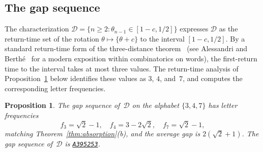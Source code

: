\documentclass{birkjour}
\newtheorem{proposition}[theorem]{Proposition}
\theoremstyle{definition}
\theoremstyle{remark}
\newcommand{\frc}[1]{\{ #1 \}}
\begin{document}
\subsection{The gap sequence}

The characterization
$\mathcal{D}=\{n\ge 2:\theta_{n-1}\in[1-c,1/2]\}$
expresses $\mathcal{D}$ as the return-time set of
the rotation $\theta\mapsto\frc{\theta+c}$ to the
interval $[1-c,1/2]$. By a standard return-time form of the
three-distance theorem~\cite{Sos} (see Alessandri and
Berth\'e~\cite{AlessandriBerthe} for a modern
exposition within combinatorics on words),
the first-return time to the interval takes at most three
values. The
return-time analysis of
Proposition~\ref{prop:defect_substitution} below
identifies these values as $3$, $4$, and~$7$, and
computes the corresponding letter frequencies.

\begin{proposition}\label{prop:defect_substitution}
The gap sequence of~$\mathcal{D}$ on the alphabet
$\{3,4,7\}$ has letter frequencies
\[
  f_{3}=\sqrt{2}-1,\quad f_{4}=3-2\sqrt{2},\quad f_{7}=\sqrt{2}-1,
\]
matching Theorem~\ref{thm:absorption}(b), and the
average gap is $2(\sqrt{2}+1)$. The gap sequence
of~$\mathcal{D}$ is
\href{https://oeis.org/A395253}{\texttt{A395253}}.
\end{proposition}
\end{document}
